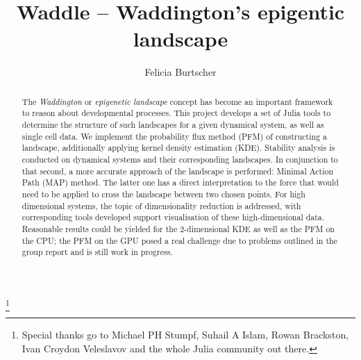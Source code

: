 \documentclass[journal, a4paper]{IEEEtran}
\begin{document}
	\title{Waddle -- Waddington's epigentic landscape}
	\author{Felicia Burtscher}
	\thanks{Special thanks go to Michael PH Stumpf, Suhail A Islam, Rowan Brackston, Ivan Croydon Veleslavov and the whole Julia community out there.}\\
	
\maketitle


\begin{abstract}
The \textit{Waddington} or \textit{epigenetic landscape} concept has become an important framework to reason about developmental processes. This project develops a set of Julia tools to determine the structure of such landscapes for a given dynamical system, as well as single cell data. We implement the probability flux method (PFM) of constructing a landscape, additionally applying kernel density estimation (KDE). Stability analysis is conducted on dynamical systems and their corresponding landscapes. In conjunction to that second, a more accurate approach %
of the landscape is performed: Minimal Action Path (MAP) method. The latter one has a direct interpretation to the force that would need to be applied to cross the landscape between two chosen points. %
For high dimensional systems, the topic of dimensionality reduction is addressed, with corresponding tools developed support visualisation of these high-dimensional data.
Reasonable results could be yielded for the 2-dimensional KDE as well as the PFM on the CPU; the PFM on the GPU posed a real challenge due to problems outlined in the group report and is still work in progress.


\end{abstract}

\end{document}
